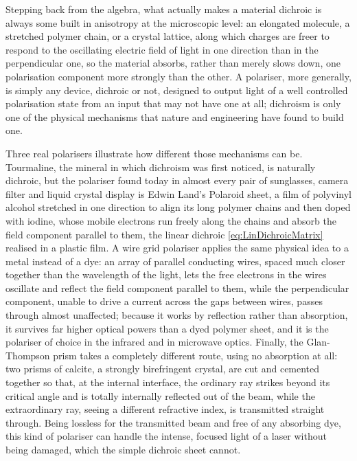             Stepping back from the algebra, what actually makes a material dichroic is always some built in anisotropy at the microscopic level: an elongated molecule, a stretched polymer chain, or a crystal lattice, along which charges are freer to respond to the oscillating electric field of light in one direction than in the perpendicular one, so the material absorbs, rather than merely slows down, one polarisation component more strongly than the other. A polariser, more generally, is simply any device, dichroic or not, designed to output light of a well controlled polarisation state from an input that may not have one at all; dichroism is only one of the physical mechanisms that nature and engineering have found to build one.

            Three real polarisers illustrate how different those mechanisms can be. Tourmaline, the mineral in which dichroism was first noticed, is naturally dichroic, but the polariser found today in almost every pair of sunglasses, camera filter and liquid crystal display is Edwin Land's Polaroid sheet, a film of polyvinyl alcohol stretched in one direction to align its long polymer chains and then doped with iodine, whose mobile electrons run freely along the chains and absorb the field component parallel to them, the linear dichroic \ref{eq:LinDichroicMatrix} realised in a plastic film. A wire grid polariser applies the same physical idea to a metal instead of a dye: an array of parallel conducting wires, spaced much closer together than the wavelength of the light, lets the free electrons in the wires oscillate and reflect the field component parallel to them, while the perpendicular component, unable to drive a current across the gaps between wires, passes through almost unaffected; because it works by reflection rather than absorption, it survives far higher optical powers than a dyed polymer sheet, and it is the polariser of choice in the infrared and in microwave optics. Finally, the Glan-Thompson prism takes a completely different route, using no absorption at all: two prisms of calcite, a strongly birefringent crystal, are cut and cemented together so that, at the internal interface, the ordinary ray strikes beyond its critical angle and is totally internally reflected out of the beam, while the extraordinary ray, seeing a different refractive index, is transmitted straight through. Being lossless for the transmitted beam and free of any absorbing dye, this kind of polariser can handle the intense, focused light of a laser without being damaged, which the simple dichroic sheet cannot.


